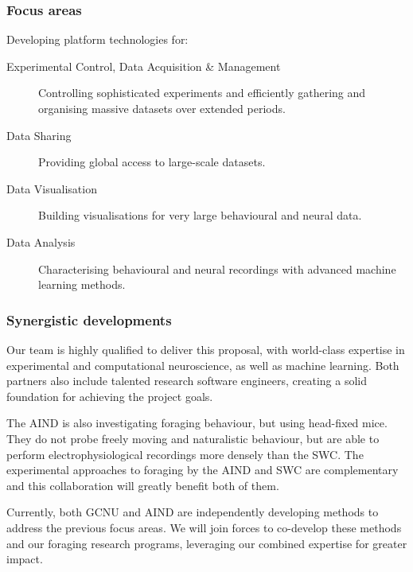 
\subsubsection{Focus areas}

Developing platform technologies for:

\begin{description}

    \item[Experimental Control, Data Acquisition \& Management] Controlling
        sophisticated experiments and efficiently gathering and organising
        massive datasets over extended periods.

    \item[Data Sharing] Providing global access to large-scale datasets.

    \item[Data Visualisation] Building visualisations for very large
        behavioural and neural data.

    \item[Data Analysis] Characterising behavioural and neural recordings with
        advanced machine learning methods.

\end{description}

\subsubsection{Synergistic developments}

Our team is highly qualified to deliver this proposal, with world-class
expertise in experimental and computational neuroscience, as well as machine
learning.
%
Both partners also include talented research software engineers, creating a
solid foundation for achieving the project goals.

%

The AIND is also investigating foraging behaviour, but using head-fixed mice.
They do not probe freely moving and naturalistic behaviour, but are able to
perform electrophysiological recordings more densely than the SWC.
%
The experimental approaches to foraging by the AIND and SWC are complementary
and this collaboration will greatly benefit both of them.

Currently, both GCNU and AIND are independently developing methods to address
the previous focus areas. We will join forces to co-develop these methods and
our foraging research programs, leveraging our combined expertise for greater
impact.
